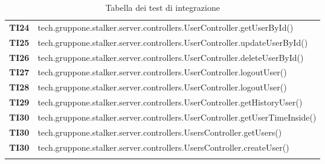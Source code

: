 \documentclass[../../piano-di-qualifica.tex]{subfiles}
\begin{document}
\begin{longtable}[H]{>{\centering\bfseries}m{3cm} >{}m{13cm}}
  TI24               & tech.gruppone.stalker.server.controllers.UserController.getUserById\@() \\ 

  TI25               & tech.gruppone.stalker.server.controllers.UserController.updateUserById\@() \\ 

  TI26               & tech.gruppone.stalker.server.controllers.UserController.deleteUserById\@() \\ 

  TI27               & tech.gruppone.stalker.server.controllers.UserController.logoutUser\@() \\ 

  TI28               & tech.gruppone.stalker.server.controllers.UserController.logoutUser\@() \\ 

  TI29               & tech.gruppone.stalker.server.controllers.UserController.getHistoryUser\@() \\ 

  TI30               & tech.gruppone.stalker.server.controllers.UserController.getUserTimeInside\@() \\ 

  TI30               & tech.gruppone.stalker.server.controllers.UsersController.getUsers\@() \\ 

  TI30               & tech.gruppone.stalker.server.controllers.UsersController.createUser\@() \\ 

  \rowcolor{white}
  \caption{Tabella dei test di integrazione}%
  \label{tab:test_integrazione}
\end{longtable}
\end{document}
